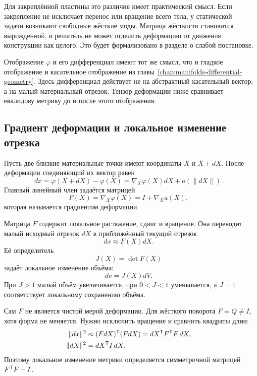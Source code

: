 Для закреплённой пластины это различие имеет практический смысл. Если закрепление не исключает перенос или вращение всего тела, у статической задачи возникают свободные жёсткие моды. Матрица жёсткости становится вырожденной, и решатель не может отделить деформацию от движения конструкции как целого. Это будет формализовано в разделе о слабой постановке.

\begin{connection}
Отображение $\varphi$ и его дифференциал имеют тот же смысл, что и гладкое отображение и касательное отображение из главы~\ref{chap:manifolds-differential-geometry}. Здесь дифференциал действует не на абстрактный касательный вектор, а на малый материальный отрезок. Тензор деформации ниже сравнивает евклидову метрику до и после этого отображения.
\end{connection}

\subsection{Градиент деформации и локальное изменение отрезка}

Пусть две близкие материальные точки имеют координаты $X$ и $X+dX$. После деформации соединяющий их вектор равен
\[
dx
=
\varphi(X+dX)-\varphi(X)
=
\nabla_X\varphi(X)dX+o(\lVert dX\rVert).
\]
Главный линейный член задаётся матрицей
\begin{equation}
\label{eq:deformation-gradient-v01}
F(X)=\nabla_X\varphi(X)=I+\nabla_Xu(X),
\end{equation}
которая называется градиентом деформации.

Матрица $F$ содержит локальное растяжение, сдвиг и вращение. Она переводит малый исходный отрезок $dX$ в приближённый текущий отрезок
\begin{equation}
\label{eq:line-element-map-v01}
dx\approx F(X)dX.
\end{equation}
Её определитель
\begin{equation}
\label{eq:jacobian-volume-v01}
J(X)=\det F(X)
\end{equation}
задаёт локальное изменение объёма:
\[
dv=J(X)dV.
\]
При $J>1$ малый объём увеличивается, при $0<J<1$ уменьшается, а $J=1$ соответствует локальному сохранению объёма.

Сам $F$ не является чистой мерой деформации. Для жёсткого поворота $F=Q\neq I$, хотя форма не меняется. Нужно исключить вращение и сравнить квадраты длин:
\begin{align}
\lVert dx\rVert^2
&\approx
(FdX)^{\mathsf{T}}(FdX)
=dX^{\mathsf{T}}F^{\mathsf{T}}F\,dX,\label{eq:deformed-length-v01}\\
\lVert dX\rVert^2
&=dX^{\mathsf{T}}I\,dX.\label{eq:reference-length-v01}
\end{align}
Поэтому локальное изменение метрики определяется симметричной матрицей $F^{\mathsf{T}}F-I$.

